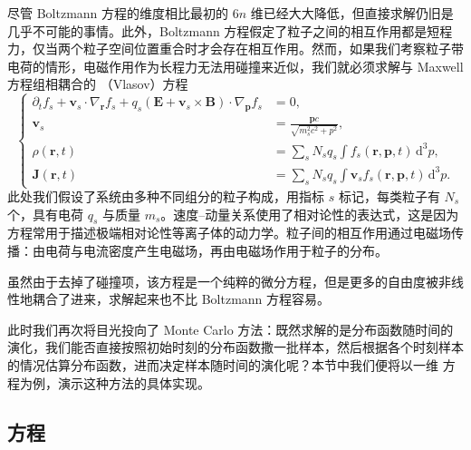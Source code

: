 尽管 Boltzmann 方程的维度相比最初的 $6n$ 维已经大大降低，但直接求解仍旧是几乎不可能的事情。此外，Boltzmann 方程假定了粒子之间的相互作用都是短程力，仅当两个粒子空间位置重合时才会存在相互作用。然而，如果我们考察粒子带电荷的情形，电磁作用作为长程力无法用碰撞来近似，我们就必须求解与 Maxwell 方程组相耦合的 （Vlasov）方程
\begin{equation}
\left\{
\begin{aligned}
\partial_t f_s+\mathbf v_s\cdot\nabla_{\mathbf r}f_s+q_s(\mathbf E+\mathbf v_s\times\mathbf B)\cdot\nabla_{\mathbf p}f_s&=0,\\
\mathbf v_s&=\frac{\mathbf p c}{\sqrt{m_s^2c^2+p^2}},\\
\rho(\mathbf r,t)&=\sum_s N_s q_s\int f_s(\mathbf r,\mathbf p,t)\,\mathrm d^3p,\\
\mathbf J(\mathbf r,t)&=\sum_s N_s q_s\int \mathbf v_s f_s(\mathbf r,\mathbf p,t)\,\mathrm d^3p.
\end{aligned}
\right.
\tag{7.5.6}
\end{equation}
此处我们假设了系统由多种不同组分的粒子构成，用指标 $s$ 标记，每类粒子有 $N_s$ 个，具有电荷 $q_s$ 与质量 $m_s$。速度--动量关系使用了相对论性的表达式，这是因为  方程常用于描述极端相对论性等离子体的动力学。粒子间的相互作用通过电磁场传播：由电荷与电流密度产生电磁场，再由电磁场作用于粒子的分布。

虽然由于去掉了碰撞项，该方程是一个纯粹的微分方程，但是更多的自由度被非线性地耦合了进来，求解起来也不比 Boltzmann 方程容易。

此时我们再次将目光投向了 Monte Carlo 方法：既然求解的是分布函数随时间的演化，我们能否直接按照初始时刻的分布函数撒一批样本，然后根据各个时刻样本的情况估算分布函数，进而决定样本随时间的演化呢？本节中我们便将以一维  方程为例，演示这种方法的具体实现。

\subsection{ 方程}


